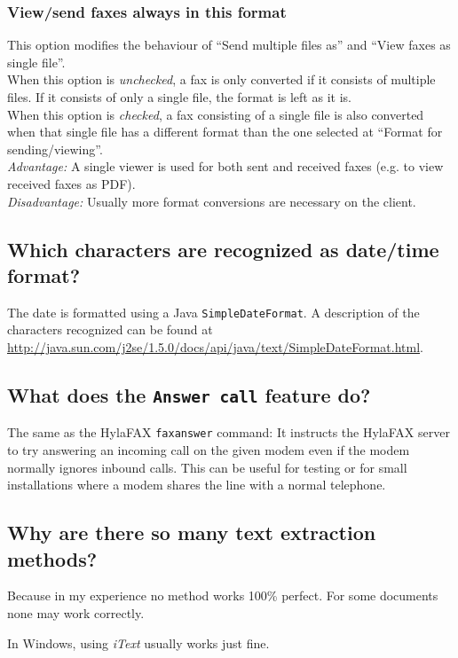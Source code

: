 \documentclass[a4paper,10pt]{scrartcl}
\begin{document}
\subsubsection{View/send faxes always in this format}
This option modifies the behaviour of ``Send multiple files as'' and ``View faxes as single file''.\\
When this option is \textit{unchecked}, a fax is only converted if it consists of multiple files. If it consists of only a single file, the format is left as it is.\\
When this option is \textit{checked}, a fax consisting of a single file is also converted when that single file has a different format than the one selected at ``Format for sending/viewing''.\\
\textit{Advantage:} A single viewer is used for both sent and received faxes (e.g. to view received faxes as PDF).\\
\textit{Disadvantage:} Usually more format conversions are necessary on the client.

\subsection{Which characters are recognized as date/time format?}

The date is formatted using a Java \texttt{SimpleDateFormat}. A description of the characters recognized can be found at \url{http://java.sun.com/j2se/1.5.0/docs/api/java/text/SimpleDateFormat.html}.

\subsection{What does the \texttt{Answer call} feature do?}

The same as the HylaFAX \verb#faxanswer# command: It instructs the HylaFAX server to try answering an incoming call on the given modem even if the modem normally ignores inbound calls. This can be useful for testing or for small installations where a modem shares the line with a normal telephone.

\subsection{Why are there so many text extraction methods?}

Because in my experience no method works 100\% perfect. For some documents none may work correctly.

In Windows, using \textit{iText} usually works just fine.
\end{document}
